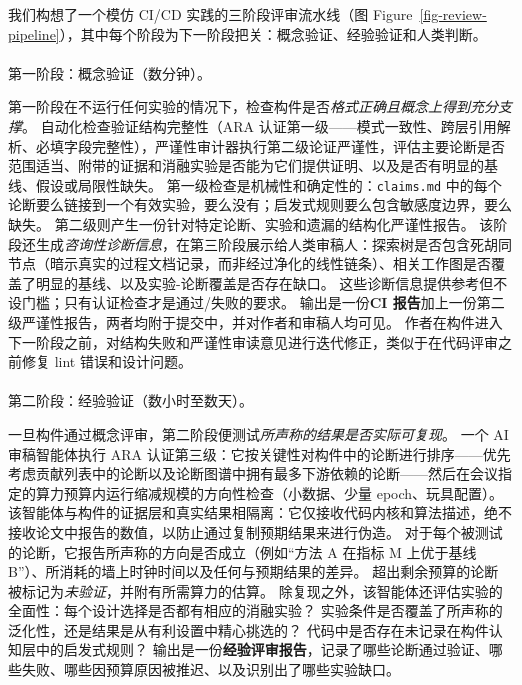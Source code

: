 \documentclass[
]{article}
\makeatletter
\let\oldparagraph\paragraph
\renewcommand{\paragraph}{
    \@ifstar
      \xxxParagraphStar
      \xxxParagraphNoStar
  }
\newcommand{\xxxParagraphStar}[1]{\oldparagraph*{#1}\mbox{}}
\newcommand{\xxxParagraphNoStar}[1]{\oldparagraph{#1}\mbox{}}
\newcommand{\passthrough}[1]{#1}
\theoremstyle{definition}
\makeatother
\begin{document}
我们构想了一个模仿 CI/CD 实践的三阶段评审流水线（图
Figure~\ref{fig-review-pipeline}），其中每个阶段为下一阶段把关：概念验证、经验验证和人类判断。

\paragraph{第一阶段：概念验证（数分钟）。}\label{ux7b2cux4e00ux9636ux6bb5ux6982ux5ff5ux9a8cux8bc1ux6570ux5206ux949f}

第一阶段在不运行任何实验的情况下，检查构件是否\emph{格式正确且概念上得到充分支撑}。
自动化检查验证结构完整性（ARA
认证第一级------模式一致性、跨层引用解析、必填字段完整性），严谨性审计器执行第二级论证严谨性，评估主要论断是否范围适当、附带的证据和消融实验是否能为它们提供证明、以及是否有明显的基线、假设或局限性缺失。
第一级检查是机械性和确定性的：\passthrough{\lstinline!claims.md!}
中的每个论断要么链接到一个有效实验，要么没有；启发式规则要么包含敏感度边界，要么缺失。
第二级则产生一份针对特定论断、实验和遗漏的结构化严谨性报告。
该阶段还生成\emph{咨询性诊断信息}，在第三阶段展示给人类审稿人：探索树是否包含死胡同节点（暗示真实的过程文档记录，而非经过净化的线性链条）、相关工作图是否覆盖了明显的基线、以及实验-论断覆盖是否存在缺口。
这些诊断信息提供参考但不设门槛；只有认证检查才是通过/失败的要求。
输出是一份\textbf{CI
报告}加上一份第二级严谨性报告，两者均附于提交中，并对作者和审稿人均可见。
作者在构件进入下一阶段之前，对结构失败和严谨性审读意见进行迭代修正，类似于在代码评审之前修复
lint 错误和设计问题。

\paragraph{第二阶段：经验验证（数小时至数天）。}\label{ux7b2cux4e8cux9636ux6bb5ux7ecfux9a8cux9a8cux8bc1ux6570ux5c0fux65f6ux81f3ux6570ux5929}

一旦构件通过概念评审，第二阶段便测试\emph{所声称的结果是否实际可复现}。
一个 AI 审稿智能体执行 ARA
认证第三级：它按关键性对构件中的论断进行排序------优先考虑贡献列表中的论断以及论断图谱中拥有最多下游依赖的论断------然后在会议指定的算力预算内运行缩减规模的方向性检查（小数据、少量
epoch、玩具配置）。
该智能体与构件的证据层和真实结果相隔离：它仅接收代码内核和算法描述，绝不接收论文中报告的数值，以防止通过复制预期结果来进行伪造。
对于每个被测试的论断，它报告所声称的方向是否成立（例如``方法 A 在指标 M
上优于基线 B''）、所消耗的墙上时钟时间以及任何与预期结果的差异。
超出剩余预算的论断被标记为\emph{未验证}，并附有所需算力的估算。
除复现之外，该智能体还评估实验的全面性：每个设计选择是否都有相应的消融实验？
实验条件是否覆盖了所声称的泛化性，还是结果是从有利设置中精心挑选的？
代码中是否存在未记录在构件认知层中的启发式规则？
输出是一份\textbf{经验评审报告}，记录了哪些论断通过验证、哪些失败、哪些因预算原因被推迟、以及识别出了哪些实验缺口。
\end{document}
